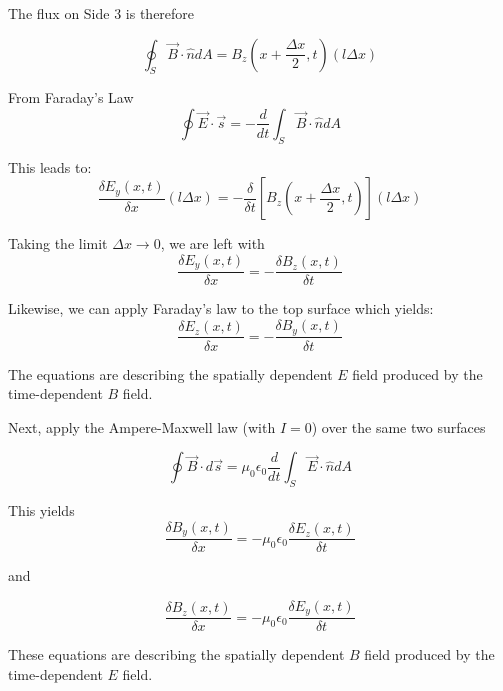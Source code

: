 \documentclass[14pt]{memoir}
\begin{document}
The flux on Side 3 is therefore

\begin{equation}
\oint_S \vec{B} \cdot \hat{n} dA = B_z(x + \frac{\Delta x}{2},t) (l \Delta x)
\end{equation}

From Faraday's Law
\begin{equation}
\oint \vec{E} \cdot \vec{s} = -\frac{d}{dt}\int_S \vec{B} \cdot \hat{n} dA
\end{equation}

This leads to:
\begin{equation}
\frac{\delta E_y(x, t)}{\delta x} (l \Delta x) = -\frac{\delta}{\delta t} [B_z(x + \frac{\Delta x}{2},t)] (l \Delta x)
\end{equation}

Taking the limit $ \Delta x \rightarrow 0$, we are left with
\begin{equation}
\frac{\delta E_y(x, t)}{\delta x}  = -\frac{\delta B_z(x,t)}{\delta t}
\end{equation}

Likewise, we can apply Faraday's law to the top surface which yields:
\begin{equation}
\frac{\delta E_z(x, t)}{\delta x}  = -\frac{\delta B_y(x,t)}{\delta t}
\end{equation}

The equations are describing the spatially dependent $E$ field produced by the time-dependent $B$ field. 


Next, apply the Ampere-Maxwell law (with $I = 0$) over the same two surfaces

\begin{equation}
\oint \vec{B} \cdot d\vec{s} = \mu_0 \epsilon_0 \frac{d}{dt} \int_S \vec{E} \cdot \hat{n} dA
\end{equation}

This yields
\begin{equation}
\frac{\delta B_y(x, t)}{\delta x}  = - \mu_0 \epsilon_0 \frac{\delta E_z(x,t)}{\delta t}
\end{equation}

and 

\begin{equation}
\frac{\delta B_z(x, t)}{\delta x}  = - \mu_0 \epsilon_0 \frac{\delta E_y(x,t)}{\delta t}
\end{equation}

These equations are describing the spatially dependent $B$ field produced by the time-dependent $E$ field. 
\end{document}
